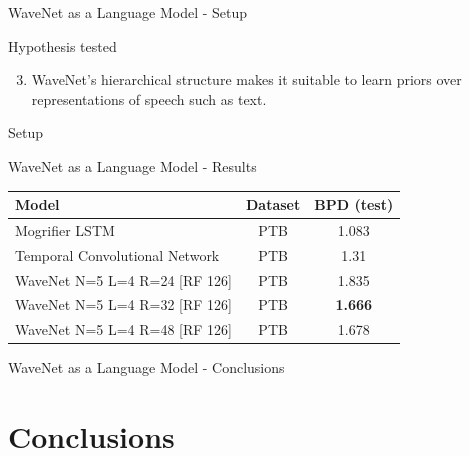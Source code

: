 \documentclass[
  ignorenonframetext,
  aspectratio=169,
]{beamer}
\providecommand{\tightlist}{%
  \setlength{\itemsep}{0pt}\setlength{\parskip}{0pt}}
\begin{document}
\begin{frame}{WaveNet as a Language Model - Setup}
\protect\hypertarget{wavenet-as-a-language-model---setup}{}
\begin{block}{Hypothesis tested}
\protect\hypertarget{hypothesis-tested-3}{}
\begin{enumerate}[<+->]
\setcounter{enumi}{2}
\tightlist
\item
  WaveNet's hierarchical structure makes it suitable to learn priors
  over representations of speech such as text.
\end{enumerate}
\end{block}

\begin{block}{Setup}
\protect\hypertarget{setup-1}{}
\end{block}
\end{frame}

\begin{frame}{WaveNet as a Language Model - Results}
\protect\hypertarget{wavenet-as-a-language-model---results}{}
\begin{table}[htb]
    \centering
    \begin{tabular}{l|c||c}
        Model & Dataset & BPD (test) \\
        \hline
        Mogrifier LSTM \cite{melis_mogrifier_2020} & PTB & 1.083 \\
        Temporal Convolutional Network \cite{bai_empirical_2018} & PTB & 1.31 \\
        \hline
        WaveNet N=5 L=4 R=24 [RF 126] & PTB & 1.835 \\
        WaveNet N=5 L=4 R=32 [RF 126] & PTB & \textbf{1.666} \\
        WaveNet N=5 L=4 R=48 [RF 126] & PTB & 1.678 \\
    \end{tabular}
\end{table}
\end{frame}

\begin{frame}{WaveNet as a Language Model - Conclusions}
\protect\hypertarget{wavenet-as-a-language-model---conclusions}{}
\end{frame}

\hypertarget{conclusions}{%
\section{Conclusions}\label{conclusions}}
\end{document}
